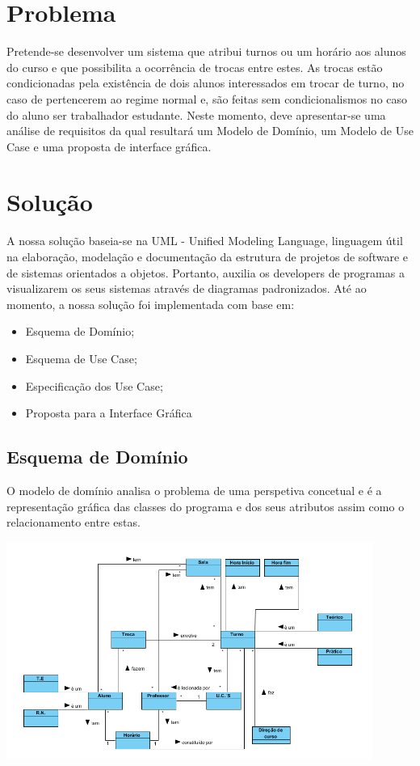 \documentclass[a4paper]{article}
\begin{document}
\section{Problema}
\label{sec:2}

\hspace{3mm}

Pretende-se desenvolver um sistema que atribui turnos ou um horário aos alunos do curso e que possibilita a ocorrência de trocas entre estes. As trocas estão condicionadas pela existência de dois alunos interessados em trocar de turno, no caso de pertencerem ao regime normal e, são feitas sem condicionalismos no caso do aluno ser trabalhador estudante.
Neste momento, deve apresentar-se uma análise de requisitos da qual resultará um Modelo de Domínio, um Modelo de Use Case e uma proposta de interface gráfica.

\section{Solução}
\label{sec:3}


A nossa solução baseia-se na UML - Unified Modeling Language, linguagem útil na elaboração, modelação e documentação da estrutura de projetos de software e de sistemas orientados a objetos. Portanto, auxilia os developers de programas a visualizarem os seus sistemas através de diagramas padronizados.
Até ao momento, a nossa solução foi implementada com base em:

\begin{itemize}
    \item Esquema de Domínio;
    \item Esquema de Use Case;
    \item Especificação dos Use Case;
    \item Proposta para a Interface Gráfica
\end{itemize}

\subsection{Esquema de Domínio}
O modelo de domínio analisa o problema de uma perspetiva concetual e é a representação gráfica das classes do programa e dos seus atributos assim como o relacionamento entre estas.

\includegraphics[width=12cm]{dominio}\break
\end{document}
